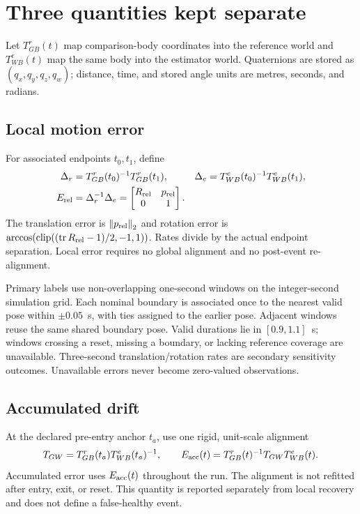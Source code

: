 \documentclass[11pt,a4paper]{article}
\newcommand{\norm}[1]{\left\lVert #1\right\rVert}
\begin{document}
\section{Three quantities kept separate}
Let $T^r_{GB}(t)$ map comparison-body coordinates into the reference world and
$T^e_{WB}(t)$ map the same body into the estimator world. Quaternions are stored
as $(q_x,q_y,q_z,q_w)$; distance, time, and stored angle units are metres,
seconds, and radians.

\subsection{Local motion error}
For associated endpoints $t_0,t_1$, define
\begin{align}
 \Delta_r &= T^r_{GB}(t_0)^{-1}T^r_{GB}(t_1), &
 \Delta_e &= T^e_{WB}(t_0)^{-1}T^e_{WB}(t_1),\\
 E_{\rm rel} &= \Delta_r^{-1}\Delta_e
              =\begin{bmatrix}R_{\rm rel}&p_{\rm rel}\\0&1\end{bmatrix}.
\end{align}
The translation error is $\norm{p_{\rm rel}}_2$ and rotation error is
$\arccos\!\left(\operatorname{clip}((\operatorname{tr}R_{\rm rel}-1)/2,-1,1)\right)$.
Rates divide by the actual endpoint separation. Local error requires no
global alignment and no post-event re-alignment.

Primary labels use non-overlapping one-second windows on the integer-second
simulation grid. Each nominal boundary is associated once to the nearest valid
pose within $\pm0.05$~s, with ties assigned to the earlier pose. Adjacent windows
reuse the same shared boundary pose. Valid durations lie in $[0.9,1.1]$~s;
windows crossing a reset, missing a boundary, or lacking reference coverage are
unavailable. Three-second translation/rotation rates are secondary sensitivity
outcomes. Unavailable errors never become zero-valued observations.

\subsection{Accumulated drift}
At the declared pre-entry anchor $t_a$, use one rigid, unit-scale alignment
\begin{equation}
 T_{GW}=T^r_{GB}(t_a)T^e_{WB}(t_a)^{-1},\qquad
 E_{\rm acc}(t)=T^r_{GB}(t)^{-1}T_{GW}T^e_{WB}(t).
\end{equation}
Accumulated error uses $E_{\rm acc}(t)$ throughout the run. The alignment is not
refitted after entry, exit, or reset. This quantity is reported separately
from local recovery and does not define a false-healthy event.
\end{document}
